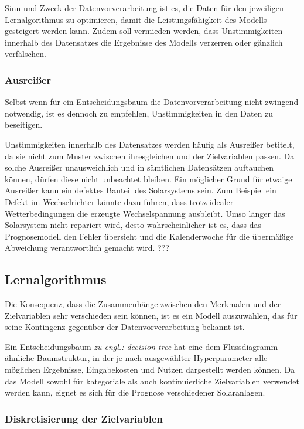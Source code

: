 \documentclass[12pt, a4paper]{article}
\begin{document}
Sinn und Zweck der Datenvorverarbeitung ist es, die Daten für den jeweiligen Lernalgorithmus zu optimieren, damit die Leistungsfähigkeit des Modells gesteigert werden kann. Zudem soll vermieden werden, dass Unstimmigkeiten innerhalb des Datensatzes die Ergebnisse des Modells verzerren oder gänzlich verfälschen.

\subsubsection{Ausreißer}
\label{subsubsec:outlier}

Selbst wenn für ein Entscheidungsbaum die Datenvorverarbeitung nicht zwingend notwendig, ist es dennoch zu empfehlen, Unstimmigkeiten in den Daten zu beseitigen.

Unstimmigkeiten innerhalb des Datensatzes werden häufig als Ausreißer betitelt, da sie nicht zum Muster zwischen ihresgleichen und der Zielvariablen passen. Da solche Ausreißer unausweichlich und in sämtlichen Datensätzen auftauchen können, dürfen diese nicht unbeachtet bleiben. Ein möglicher Grund für etwaige Ausreißer kann ein defektes Bauteil des Solarsystems sein. Zum Beispiel ein Defekt im Wechselrichter könnte dazu führen, dass trotz idealer Wetterbedingungen die erzeugte Wechselspannung ausbleibt. Umso länger das Solarsystem nicht repariert wird, desto wahrscheinlicher ist es, dass das Prognosemodell den Fehler übersieht und die Kalenderwoche für die übermäßige Abweichung verantwortlich gemacht wird.
???
\subsection{Lernalgorithmus}

Die Konsequenz, dass die Zusammenhänge zwischen den Merkmalen und der Zielvariablen sehr verschieden sein können, ist es ein Modell auszuwählen, das für seine Kontingenz gegenüber der Datenvorverarbeitung bekannt ist. 

Ein Entscheidungsbaum \textit{zu engl.: decision tree} hat eine dem Flussdiagramm ähnliche Baumstruktur, in der je nach ausgewählter Hyperparameter alle möglichen Ergebnisse, Eingabekosten und Nutzen dargestellt werden können. Da das Modell sowohl für kategoriale als auch kontinuierliche Zielvariablen verwendet werden kann, eignet es sich für die Prognose verschiedener Solaranlagen. 

\subsubsection{Diskretisierung der Zielvariablen}
\end{document}
